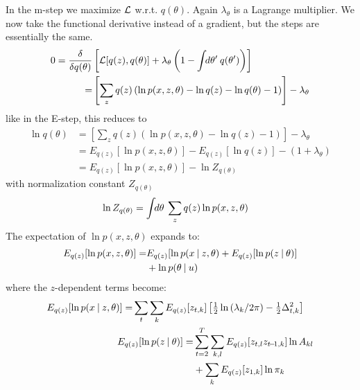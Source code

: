 In the m-step we maximize $\mathcal{L}$ w.r.t. $q(\theta)$. Again $\lambda_\theta$ is a Lagrange multiplier. We now take the functional derivative instead of a gradient, but the steps are essentially the same.
\begin{align}
  0 = \frac{\delta }{\delta q(\theta)} &
  \left[ 
    \mathcal{L}[q(z), q(\theta)] 
    + \lambda_{\theta} \left( 1 - \int \!\!d\theta' \: q(\theta') \right)
  \right] \\
  = & 
  \left[
    \sum_{z}  
    q(z)
    \left(
    \ln p(x, z, \theta)
    - \ln q(z) 
    - \ln q(\theta)
    - 1
    \right)
  \right]
  - \lambda_\theta
\end{align}
like in the E-step, this reduces to
\begin{align}
  \ln q(\theta) 
  &=
    \left[
    \sum_{z}  
    q(z)
    \left(
    \ln p(x, z, \theta)
    - \ln q(z) 
    - 1
    \right)
    \right]
    - \lambda_\theta \\
  &=
    E_{q(z)} [ \ln p(x, z, \theta) ] -  
    E_{q(z)} [ \ln q(z) ] - (1 + \lambda_\theta)\\
  &=
    E_{q(z)} [ \ln p(x, z, \theta) ] -  
    \ln Z_{q(\theta)} 
\end{align}
with normalization constant $Z_{q(\theta)}$
\begin{align}
  \ln Z_{q(\theta)}
  &= \int \!\!d\theta \: \sum_{z} q(z) \ln p(x, z, \theta)
\end{align}
The expectation of $\ln p(x, z, \theta)$ expands to:
\begin{align}
  \begin{split}
    E_{q(z)}[\ln p(x, z, \theta)]
    =&
    E_{q(z)} [ \ln p(x \:|\: z, \theta) 
    + E_{q(z)} [ \ln p(z \:|\: \theta) ] \\
    &+ \ln p(\theta \:|\: u)
  \end{split}
\end{align}
where the $z$-dependent terms become:
\begin{align}
  \begin{split}
    E_{q(z)} [ \ln p(x \:|\: z, \theta) ]
    = &  
    \sum_{t} \sum_{k}  
    E_{q(z)} [z_{t,k}] 
    \left[ 
      \tfrac{1}{2} \ln \left( \lambda_{k} / 2\pi \right)
      - \tfrac{1}{2} \Delta_{t,k}^2
    \right]
  \end{split} \\
  \begin{split}
    E_{q(z)} [ \ln p(z \:|\: \theta) ] 
    = & 
    \sum_{t=2}^{T}
    \sum_{k,l}
    E_{q(z)} [z_{t,l} z_{t \!-\! 1,k}] 
    \ln A_{kl} \\
    & + 
    \sum_k
    E_{q(z)} [z_{1,k}]
    \ln \pi_{k} 
  \end{split}
\end{align}
